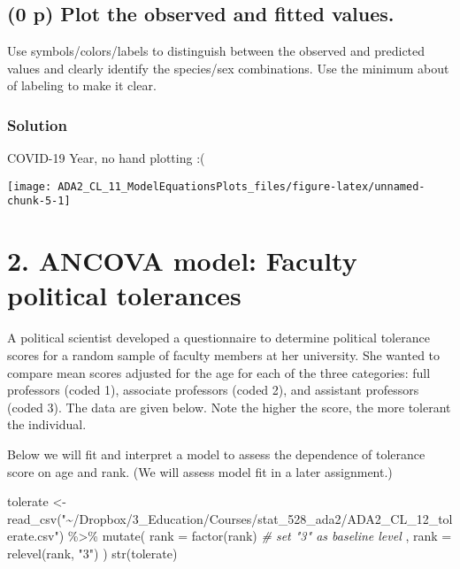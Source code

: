 \documentclass[
  12pt,
]{article}
\newenvironment{Shaded}{\begin{snugshade}}{\end{snugshade}}
\newcommand{\AttributeTok}[1]{\textcolor[rgb]{0.77,0.63,0.00}{#1}}
\newcommand{\CommentTok}[1]{\textcolor[rgb]{0.56,0.35,0.01}{\textit{#1}}}
\newcommand{\FunctionTok}[1]{\textcolor[rgb]{0.00,0.00,0.00}{#1}}
\newcommand{\NormalTok}[1]{#1}
\newcommand{\OtherTok}[1]{\textcolor[rgb]{0.56,0.35,0.01}{#1}}
\newcommand{\SpecialCharTok}[1]{\textcolor[rgb]{0.00,0.00,0.00}{#1}}
\newcommand{\StringTok}[1]{\textcolor[rgb]{0.31,0.60,0.02}{#1}}
\begin{document}
\hypertarget{p-plot-the-observed-and-fitted-values.}{%
\subsection{\texorpdfstring{\textbf{(0 p)} Plot the observed and fitted
values.}{(0 p) Plot the observed and fitted values.}}\label{p-plot-the-observed-and-fitted-values.}}

Use symbols/colors/labels to distinguish between the observed and
predicted values and clearly identify the species/sex combinations. Use
the minimum about of labeling to make it clear.

\hypertarget{solution-2}{%
\subsubsection{Solution}\label{solution-2}}

COVID-19 Year, no hand plotting :(

\begin{center}\texttt{[image: ADA2\_CL\_11\_ModelEquationsPlots\_files/figure-latex/unnamed-chunk-5-1]} \end{center}

\hypertarget{ancova-model-faculty-political-tolerances}{%
\section{2. ANCOVA model: Faculty political
tolerances}\label{ancova-model-faculty-political-tolerances}}

A political scientist developed a questionnaire to determine political
tolerance scores for a random sample of faculty members at her
university. She wanted to compare mean scores adjusted for the age for
each of the three categories: full professors (coded 1), associate
professors (coded 2), and assistant professors (coded 3). The data are
given below. Note the higher the score, the more tolerant the
individual.

Below we will fit and interpret a model to assess the dependence of
tolerance score on age and rank. (We will assess model fit in a later
assignment.)

\begin{Shaded}
\begin{Highlighting}[]
\NormalTok{tolerate }\OtherTok{\textless{}{-}}
  \FunctionTok{read\_csv}\NormalTok{(}\StringTok{"\textasciitilde{}/Dropbox/3\_Education/Courses/stat\_528\_ada2/ADA2\_CL\_12\_tolerate.csv"}\NormalTok{) }\SpecialCharTok{\%\textgreater{}\%}
  \FunctionTok{mutate}\NormalTok{(}
    \AttributeTok{rank =} \FunctionTok{factor}\NormalTok{(rank)}
    \CommentTok{\# set "3" as baseline level}
\NormalTok{  , }\AttributeTok{rank =} \FunctionTok{relevel}\NormalTok{(rank, }\StringTok{"3"}\NormalTok{)}
\NormalTok{  )}
\FunctionTok{str}\NormalTok{(tolerate)}
\end{Highlighting}
\end{Shaded}
\end{document}
